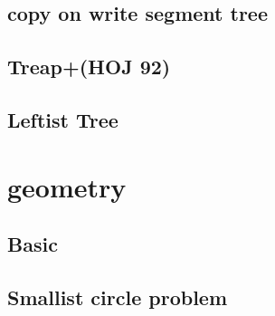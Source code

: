 \documentclass[12pt,twocolumn,oneside]{article}
\begin{document}
\subsection{copy on write segment tree}


\subsection{Treap+(HOJ 92)}


\subsection{Leftist Tree}


\section{geometry}
\subsection{Basic}


\subsection{Smallist circle problem}

\end{document}
